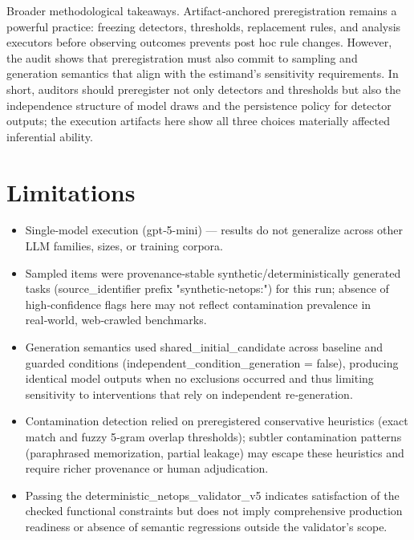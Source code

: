 \documentclass[conference]{IEEEtran}
\begin{document}
Broader methodological takeaways. Artifact‑anchored preregistration remains a powerful practice: freezing detectors, thresholds, replacement rules, and analysis executors before observing outcomes prevents post hoc rule changes. However, the audit shows that preregistration must also commit to sampling and generation semantics that align with the estimand's sensitivity requirements. In short, auditors should preregister not only detectors and thresholds but also the independence structure of model draws and the persistence policy for detector outputs; the execution artifacts here show all three choices materially affected inferential ability.

\section{Limitations}
\begin{itemize}
\item Single‑model execution (gpt‑5-mini) --- results do not generalize across other LLM families, sizes, or training corpora.
\item Sampled items were provenance‑stable synthetic/deterministically generated tasks (source\_identifier prefix "synthetic-netops:") for this run; absence of high‑confidence flags here may not reflect contamination prevalence in real‑world, web‑crawled benchmarks.
\item Generation semantics used shared\_initial\_candidate across baseline and guarded conditions (independent\_condition\_generation = false), producing identical model outputs when no exclusions occurred and thus limiting sensitivity to interventions that rely on independent re‑generation.
\item Contamination detection relied on preregistered conservative heuristics (exact match and fuzzy 5‑gram overlap thresholds); subtler contamination patterns (paraphrased memorization, partial leakage) may escape these heuristics and require richer provenance or human adjudication.
\item Passing the deterministic\_netops\_validator\_v5 indicates satisfaction of the checked functional constraints but does not imply comprehensive production readiness or absence of semantic regressions outside the validator's scope.
\end{itemize}
\end{document}

